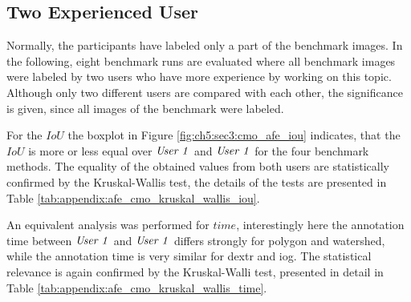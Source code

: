 \subsection{Two Experienced User} \label{ord:ch5:sec3:subsec2_cmo_afe}

Normally, the participants have labeled only a part of the benchmark images. 
In the following, eight benchmark runs are evaluated where all benchmark images were labeled by two users who have more experience by working on this topic.
Although only two different users are compared with each other, the significance is given, since all images of the benchmark were labeled.


For the $ IoU $ the boxplot in Figure \ref{fig:ch5:sec3:cmo_afe_iou} indicates, that the $ IoU $ is more or less equal over $ \textnormal{\textit{User 1}} $ and $ \textnormal{\textit{User 1}} $ for the four benchmark methods.
The equality of the obtained values from both users are statistically confirmed by the Kruskal-Wallis test, the details of the tests are presented in Table \ref{tab:appendix:afe_cmo_kruskal_wallis_iou}.

An equivalent analysis was performed for $ time $, interestingly here the annotation time between $ \textnormal{\textit{User 1}} $ and $ \textnormal{\textit{User 1}} $ differs strongly for polygon and watershed, while the annotation time is very similar for \gls{dextr} and \gls{iog}.
The statistical relevance is again confirmed by the Kruskal-Walli test, presented in detail in Table \ref{tab:appendix:afe_cmo_kruskal_wallis_time}.

